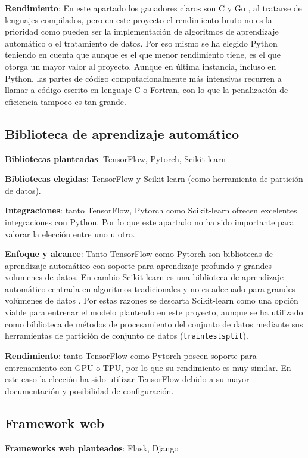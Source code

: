 \textbf{Rendimiento}: En este apartado los ganadores claros son C y Go \cite{Python3vsC}, al tratarse de lenguajes compilados, pero en este proyecto el rendimiento bruto no es la prioridad como pueden ser la implementación de algoritmos de aprendizaje automático o el tratamiento de datos.
Por eso mismo se ha elegido Python teniendo en cuenta que aunque es el que menor rendimiento tiene, es el que otorga un mayor valor al proyecto. Aunque en última instancia, incluso en Python, las partes de código computacionalmente más intensivas recurren a llamar a código escrito en lenguaje C o Fortran, con lo que la penalización de eficiencia tampoco es tan grande.

\subsection{Biblioteca de aprendizaje automático}

\textbf{Bibliotecas planteadas}: TensorFlow, Pytorch, Scikit-learn

\textbf{Bibliotecas elegidas}: TensorFlow y Scikit-learn (como herramienta de partición de datos).

\textbf{Integraciones}: tanto TensorFlow, Pytorch como Scikit-learn ofrecen excelentes integraciones con Python. Por lo que este apartado no ha sido importante para valorar la elección entre uno u otro.

\textbf{Enfoque y alcance}: Tanto TensorFlow como Pytorch son bibliotecas de aprendizaje automático con soporte para aprendizaje profundo y grandes volumenes de datos. En cambio Scikit-learn es una biblioteca de aprendizaje automático centrada en algoritmos tradicionales y no es adecuado para grandes volúmenes de datos \cite{Loobuyck_2020}.
Por estas razones se descarta Scikit-learn como una opción viable para entrenar el modelo planteado en este proyecto, aunque se ha utilizado como biblioteca de métodos de procesamiento del conjunto de datos mediante sus herramientas de partición de conjunto de datos (\texttt{train\textunderscore test\textunderscore split}).

\textbf{Rendimiento}: tanto TensorFlow como Pytorch poseen soporte para entrenamiento con GPU o TPU, por lo que su rendimiento es muy similar. En este caso la elección ha sido utilizar TensorFlow debido a su mayor documentación y posibilidad de configuración.

\subsection{Framework web}
\textbf{Frameworks web planteados}: Flask, Django

